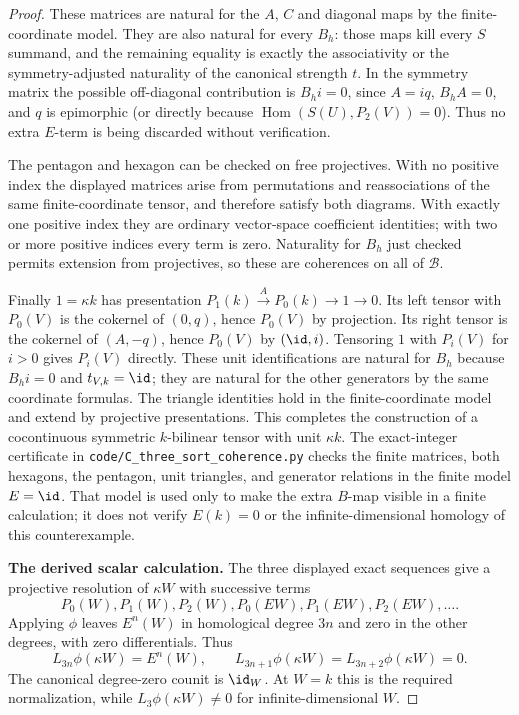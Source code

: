 \begin{proof}
These matrices are natural for the $A$, $C$ and diagonal maps by the finite-coordinate model. They are also natural for every $B_h$: those maps kill every $S$ summand, and the remaining equality is exactly the associativity or the symmetry-adjusted naturality of the canonical strength $t$. In the symmetry matrix the possible off-diagonal contribution is $B_h i=0$, since $A=i q$, $B_h A=0$, and $q$ is epimorphic (or directly because $\operatorname{Hom}(S(U),P_2(V))=0$). Thus no extra $E$-term is being discarded without verification.

The pentagon and hexagon can be checked on free projectives. With no positive index the displayed matrices arise from permutations and reassociations of the same finite-coordinate tensor, and therefore satisfy both diagrams. With exactly one positive index they are ordinary vector-space coefficient identities; with two or more positive indices every term is zero. Naturality for $B_h$ just checked permits extension from projectives, so these are coherences on all of $\mathcal B$.

Finally $1=\kappa k$ has presentation $P_1(k)\xrightarrow{A}P_0(k)\to1\to0$. Its left tensor with $P_0(V)$ is the cokernel of $(0,q)$, hence $P_0(V)$ by projection. Its right tensor is the cokernel of $(A,-q)$, hence $P_0(V)$ by $(\id,i)$. Tensoring $1$ with $P_i(V)$ for $i>0$ gives $P_i(V)$ directly. These unit identifications are natural for $B_h$ because $B_h i=0$ and $t_{V,k}=\id$; they are natural for the other generators by the same coordinate formulas. The triangle identities hold in the finite-coordinate model and extend by projective presentations. This completes the construction of a cocontinuous symmetric $k$-bilinear tensor with unit $\kappa k$. The exact-integer certificate in \texttt{code/C\_three\_sort\_coherence.py} checks the finite matrices, both hexagons, the pentagon, unit triangles, and generator relations in the finite model $E=\id$. That model is used only to make the extra $B$-map visible in a finite calculation; it does not verify $E(k)=0$ or the infinite-dimensional homology of this counterexample.

\textbf{The derived scalar calculation.}
The three displayed exact sequences give a projective resolution of $\kappa W$ with successive terms
\[
P_0(W),P_1(W),P_2(W),P_0(EW),P_1(EW),P_2(EW),\ldots.
\]
Applying $\phi$ leaves $E^n(W)$ in homological degree $3n$ and zero in the other degrees, with zero differentials. Thus
\[
L_{3n}\phi(\kappa W)=E^n(W),\qquad
L_{3n+1}\phi(\kappa W)=L_{3n+2}\phi(\kappa W)=0.
\]
The canonical degree-zero counit is $\id_W$. At $W=k$ this is the required normalization, while $L_3\phi(\kappa W)\ne0$ for infinite-dimensional $W$.


\end{proof}
